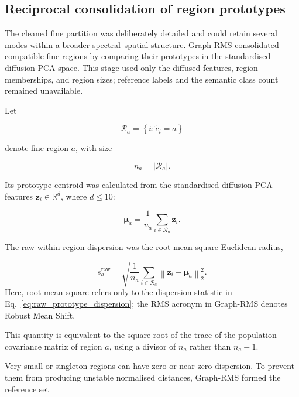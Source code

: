 \documentclass[10pt,a4paper,fleqn]{article}
\begin{document}
\subsection{Reciprocal consolidation of region prototypes}
\label{subsec:prototype_consolidation}

The cleaned fine partition was deliberately detailed and could retain several
modes within a broader spectral--spatial structure. Graph-RMS consolidated
compatible fine regions by comparing their prototypes in the standardised
diffusion-PCA space. This stage used only the diffused features, region
memberships, and region sizes; reference labels and the semantic class count
remained unavailable.

Let

\begin{equation}
\mathcal{R}_a
=
\left\{
i:\widetilde{c}_i=a
\right\}
\label{eq:fine_region}
\end{equation}

denote fine region \(a\), with size

\begin{equation}
n_a
=
\left|\mathcal{R}_a\right|.
\label{eq:region_size}
\end{equation}

Its prototype centroid was calculated from the standardised diffusion-PCA
features \(\mathbf{z}_i\in\mathbb{R}^{d}\), where \(d\leq10\):

\begin{equation}
\boldsymbol{\mu}_a
=
\frac{1}{n_a}
\sum_{i\in\mathcal{R}_a}
\mathbf{z}_i.
\label{eq:prototype_centroid}
\end{equation}

The raw within-region dispersion was the root-mean-square Euclidean radius,

\begin{equation}
s_a^{\mathrm{raw}}
=
\sqrt{
\frac{1}{n_a}
\sum_{i\in\mathcal{R}_a}
\left\|
\mathbf{z}_i-\boldsymbol{\mu}_a
\right\|_2^2
}.
\label{eq:raw_prototype_dispersion}
\end{equation}
Here, root mean square refers only to the dispersion statistic in
Eq.~\eqref{eq:raw_prototype_dispersion}; the RMS acronym in Graph-RMS denotes
Robust Mean Shift.

This quantity is equivalent to the square root of the trace of the population
covariance matrix of region \(a\), using a divisor of \(n_a\) rather than
\(n_a-1\).

Very small or singleton regions can have zero or near-zero dispersion. To
prevent them from producing unstable normalised distances, Graph-RMS formed
the reference set
\end{document}
